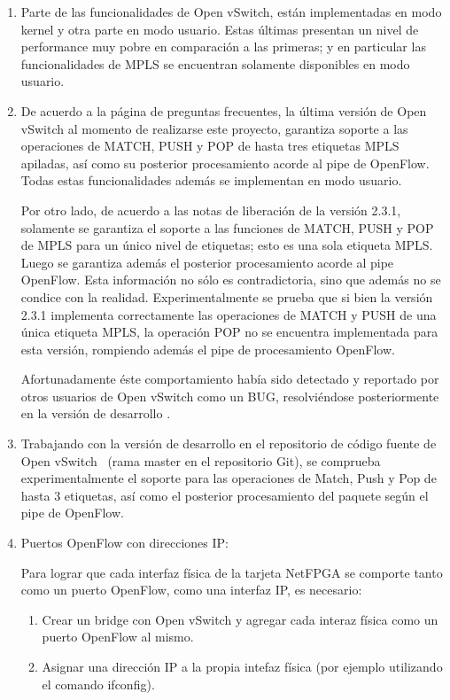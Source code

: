 \begin{enumerate}
\item Parte de las funcionalidades de Open vSwitch, est\'an implementadas en modo kernel y otra parte en modo usuario. Estas \'ultimas presentan un nivel de performance muy pobre en comparaci\'on a las primeras; y en particular las funcionalidades de MPLS se encuentran solamente disponibles en modo usuario.

\item De acuerdo a la p\'agina de preguntas frecuentes, la \'ultima versi\'on de Open vSwitch al momento de realizarse este proyecto, garantiza soporte a las operaciones de MATCH, PUSH y POP de hasta tres etiquetas MPLS apiladas, as\'i como su posterior procesamiento acorde al pipe de OpenFlow. Todas estas funcionalidades adem\'as se implementan en modo usuario.

Por otro lado, de acuerdo  a las notas de liberaci\'on de la versi\'on 2.3.1, solamente se garantiza el soporte a las funciones de MATCH, PUSH y POP de MPLS para un \'unico nivel de etiquetas; esto es una sola etiqueta MPLS. Luego se garantiza adem\'as el posterior procesamiento acorde al pipe OpenFlow. Esta informaci\'on no s\'olo es contradictoria, sino que adem\'as no se condice con la realidad. Experimentalmente se prueba que si bien la versi\'on 2.3.1 implementa correctamente las operaciones de MATCH y PUSH de una \'unica etiqueta MPLS, la operaci\'on POP no se encuentra implementada para esta versi\'on, rompiendo adem\'as el pipe de procesamiento OpenFlow. 

Afortunadamente \'este comportamiento hab\'ia sido detectado y reportado por otros usuarios de Open vSwitch como un BUG, resolviéndose posteriormente en la versi\'on de desarrollo \citep{OVSSourceCode}.

\item Trabajando con la versi\'on de desarrollo en el repositorio de c\'odigo fuente de Open vSwitch~\citep{OVSSourceCode} (rama master en el repositorio Git), se comprueba experimentalmente el soporte para las operaciones de Match, Push y Pop de hasta 3 etiquetas, as\'i como el posterior procesamiento del paquete seg\'un el pipe de  OpenFlow.

\item Puertos OpenFlow con direcciones IP:
 
Para lograr que cada interfaz f\'isica de la tarjeta NetFPGA se comporte tanto como un puerto OpenFlow, como una interfaz IP, es necesario:

\begin{enumerate}
\item Crear un bridge con Open vSwitch y agregar cada interaz f\'isica como un puerto OpenFlow al mismo.
\item Asignar una dirección IP a la propia intefaz f\'isica (por ejemplo utilizando el comando ifconfig).
\end{enumerate}


\end{enumerate}
